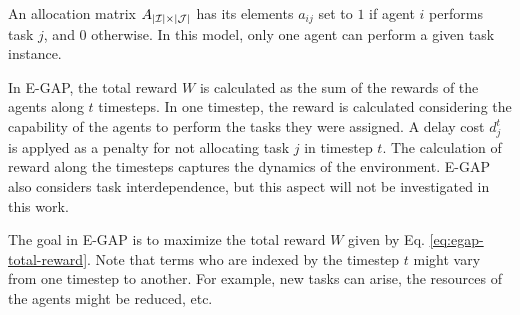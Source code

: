 \documentclass[conference]{IEEEtran}
\begin{document}
An allocation matrix $A_{|\mathcal{I}| \times |\mathcal{J}|}$ has its elements $a_{ij}$ set to $1$ if agent $i$ performs task $j$, and 0 otherwise. In this model, only one agent can perform a given task instance. %


% 
In E-GAP, the total reward $W$ is calculated as the sum of the rewards of the agents along $t$ timesteps. In one timestep, the reward is calculated considering the capability of the agents to perform the tasks they were assigned. A delay cost $d_j^t$ is applyed as a penalty for not allocating task $j$ in timestep $t$. The calculation of reward along the timesteps captures the dynamics of the environment. E-GAP also considers task interdependence, but this aspect will not be investigated in this work. 

The goal in E-GAP is to maximize the total reward $W$ given by Eq. \ref{eq:egap-total-reward}. Note that terms who are indexed by the timestep $t$ might vary from one timestep to another. For example, new tasks can arise, the resources of the agents might be reduced, etc.
\end{document}

